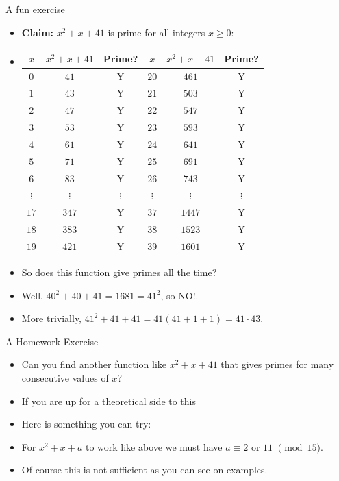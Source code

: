 \documentclass[ %
 usenames,dvipsnames,
aspectratio=169,11pt ]{beamer}
\newenvironment{stepitemize}{\begin{itemize}[<+->]}{\end{itemize} }
\begin{document}
\begin{frame}{A fun exercise}
\begin{stepitemize}
\item {\bf Claim:} $x^2+x+41$ is prime for all integers $x\geq 0$:

\item[]
\scriptsize{
\begin{table}[H]
    \centering
    \begin{tabular}{| c | c |c ||c|c|c|}
    \hline
         $x$ & $x^2+x+41$ & Prime? & $x$ & $x^2+x+41$ & Prime?\\
         \hline
         \hline
         $0$  & $41$ & Y & $20$ &$461$ & Y \\
         \hline
         $1$  & $43$ & Y & $21$ &$503$ & Y \\
         \hline
         $2$ & $47$ & Y & $22$ & $547$ & Y\\
         \hline
         $3$ & $53$ & Y & $23$ & $593$ & Y\\
         \hline
         $4$ & $61$ & Y & $24$ & $641$ & Y\\
         \hline
         $5$ & $71$ & Y & $25$ & $691$ & Y\\
         \hline
          $6$ & $83$ & Y & $26$ & $743$ & Y\\
         \hline
         $\vdots$ & $\vdots$ & $\vdots$ & $\vdots$ & $\vdots$ & $\vdots$\\
         \hline
         $17$ & $347$ & Y & $37$ & $1447$ & Y\\
         \hline
         $18$ & $383$ & Y & $38$ & $1523$ & Y\\
         \hline
         $19$ & $421$ & Y & $39$ & $1601$ & Y\\
         \hline

    \end{tabular}
    \label{tab:my_label}
\end{table}
}
 \item So does this function give primes all the time?
 \item Well, $40^2+40+41=1681=41^2$, so NO!.
 \item More trivially, $41^2+41+41=41(41+1+1)=41\cdot 43$.
 \end{stepitemize}
\end{frame}

\begin{frame}{A Homework Exercise}
    \begin{stepitemize}
    \item Can you find another function like $x^2+x+41$ that gives primes for many consecutive values of $x$?
    \item If you are up for a theoretical side to this
    \item Here is something you can try:
    \item For $x^2+x+a$ to work like above we must have $a\equiv 2$ or $11$ $\pmod{15}$.
    \item Of course this is not sufficient as you can see on examples.
    \end{stepitemize}
\end{frame}
\end{document}
